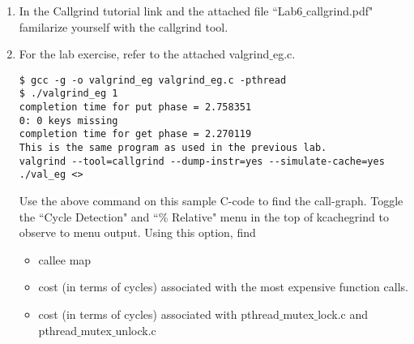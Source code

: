 \documentclass{sem5}
\author{Hemant Kumar}
\begin{document}
\begin{enumerate}
\item In the Callgrind tutorial link and the attached file ``Lab6$\_$callgrind.pdf" familarize yourself with the callgrind tool.
\item For the lab exercise, refer to the attached valgrind$\_$eg.c.
\begin{lstlisting}
$ gcc -g -o valgrind_eg valgrind_eg.c -pthread
$ ./valgrind_eg 1
completion time for put phase = 2.758351
0: 0 keys missing
completion time for get phase = 2.270119
This is the same program as used in the previous lab.
valgrind --tool=callgrind --dump-instr=yes --simulate-cache=yes ./val_eg <>
\end{lstlisting}

Use the above command on this sample C-code to find the call-graph. Toggle the ``Cycle Detection" and ``\% Relative" menu in the top of kcachegrind to observe to menu output. Using this option, find
\begin{itemize}

\item callee map
\item cost (in terms of cycles) associated with the most expensive function calls.
\item cost (in terms of cycles) associated with pthread$\_$mutex$\_$lock.c and pthread$\_$mutex$\_$unlock.c

\end{itemize}
\end{enumerate}
\end{document}
